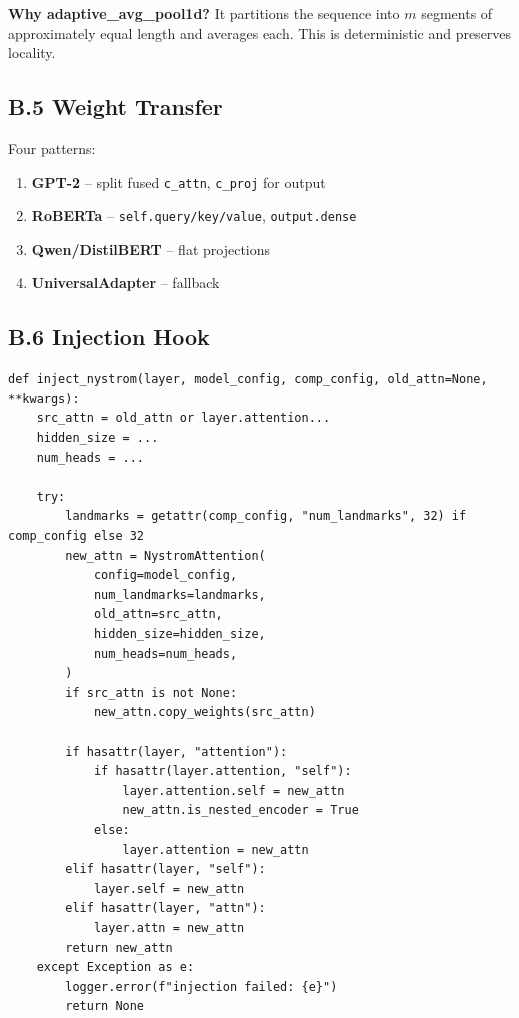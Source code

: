 \textbf{Why adaptive\_avg\_pool1d?} It partitions the sequence into $m$ segments 
of approximately equal length and averages each. This is deterministic and 
preserves locality.

\subsection{B.5 Weight Transfer}

Four patterns:

\begin{enumerate}
\item \textbf{GPT-2} -- split fused \texttt{c\_attn}, \texttt{c\_proj} for output
\item \textbf{RoBERTa} -- \texttt{self.query/key/value}, \texttt{output.dense}
\item \textbf{Qwen/DistilBERT} -- flat projections
\item \textbf{UniversalAdapter} -- fallback

\end{enumerate}
\subsection{B.6 Injection Hook}

\begin{lstlisting}
def inject_nystrom(layer, model_config, comp_config, old_attn=None, **kwargs):
    src_attn = old_attn or layer.attention...
    hidden_size = ...
    num_heads = ...
    
    try:
        landmarks = getattr(comp_config, "num_landmarks", 32) if comp_config else 32
        new_attn = NystromAttention(
            config=model_config,
            num_landmarks=landmarks,
            old_attn=src_attn,
            hidden_size=hidden_size,
            num_heads=num_heads,
        )
        if src_attn is not None:
            new_attn.copy_weights(src_attn)
        
        if hasattr(layer, "attention"):
            if hasattr(layer.attention, "self"):
                layer.attention.self = new_attn
                new_attn.is_nested_encoder = True
            else:
                layer.attention = new_attn
        elif hasattr(layer, "self"):
            layer.self = new_attn
        elif hasattr(layer, "attn"):
            layer.attn = new_attn
        return new_attn
    except Exception as e:
        logger.error(f"injection failed: {e}")
        return None
\end{lstlisting}

